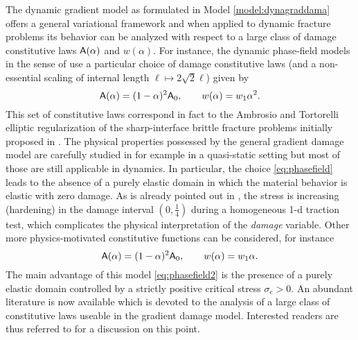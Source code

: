 The dynamic gradient model as formulated in Model \ref{model:dynagraddama} offers a general variational framework and when applied to dynamic fracture problems its behavior can be analyzed with respect to a large class of damage constitutive laws $\mathsf{A}(\alpha)$ and $w(\alpha)$. For instance, the dynamic phase-field models in the sense of \cite{HofackerMiehe:2012,BordenVerhooselScottHughesLandis:2012,SchlueterWillenbuecherKuhnMueller:2014} use a particular choice of damage constitutive laws (and a non-essential scaling of internal length $\ell\mapsto 2\sqrt{2}\ell$) given by
\begin{equation} \label{eq:phasefield}
\mathsf{A}(\alpha)=(1-\alpha)^2\mathsf{A}_0,\qquad w(\alpha)=w_1\alpha^2.
\end{equation}
This set of constitutive laws correspond in fact to the Ambrosio and Tortorelli elliptic regularization of the sharp-interface brittle fracture problems initially proposed in \cite{BourdinFrancfortMarigo:2000}. The physical properties possessed by the general gradient damage model are carefully studied in for example \cite{PhamAmorMarigoMaurini:2011,PhamMarigoMaurini:2011} in a quasi-static setting but most of those are still applicable in dynamics. In particular, the choice \eqref{eq:phasefield} leads to the absence of a purely elastic domain in which the material behavior is elastic with zero damage. As is already pointed out in \cite{BordenVerhooselScottHughesLandis:2012,SchlueterWillenbuecherKuhnMueller:2014}, the stress is increasing (hardening) in the damage interval $(0,\frac{1}{4})$ during a homogeneous 1-d traction test, which complicates the physical interpretation of the \emph{damage} variable. Other more physics-motivated constitutive functions can be considered, for instance
\begin{equation} \label{eq:phasefield2}
\mathsf{A}(\alpha)=(1-\alpha)^2\mathsf{A}_0,\qquad w(\alpha)=w_1\alpha.
\end{equation}
The main advantage of this model \eqref{eq:phasefield2} is the presence of a purely elastic domain controlled by a strictly positive critical stress $\sigma_\mathrm{c}>0$. An abundant literature is now available which is devoted to the analysis of a large class of constitutive laws useable in the gradient damage model. Interested readers are thus referred to \cite{PhamMarigo:2013,PhamAmorMarigoMaurini:2011,PhamMarigo:2013-1,PhamMarigoMaurini:2011} for a discussion on this point. 


